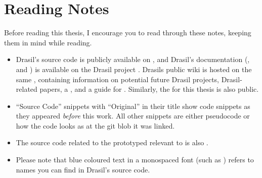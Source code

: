 \chapter{Reading Notes}
\label{chap:reading_notes}

Before reading this thesis, I encourage you to read through these notes, keeping
them in mind while reading.

\begin{itemize}

      \item Drasil's source code is publicly available on
            , and
            Drasil's documentation
            (,
            and
            )
            is available on the Drasil project
            .
            Drasils public wiki is hosted on the same ,
            containing information on potential future Drasil projects,
            Drasil-related papers, a ,
            and a guide for .
            Similarly, the 
            for this thesis is also public.

      \item ``Source Code'' snippets with ``Original'' in their title show code
            snippets as they appeared \textit{before} this work. All other
            snippets are either pseudocode or how the code looks as at the git
            blob it was linked.

      \item The source code related to the prototyped \ChunkDB{} relevant to
             is also .

      \item Please note that blue coloured text in a monospaced font (such as
            \ExampleText{}) refers to names you can find in Drasil's source
            code.


\end{itemize}

